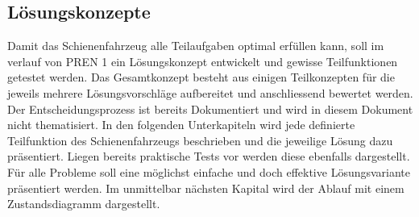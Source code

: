 \documentclass[../../main.tex]{subfiles}
\begin{document}
\subsection{Lösungskonzepte}
Damit das Schienenfahrzeug alle Teilaufgaben optimal erfüllen kann, soll im verlauf von PREN 1 ein Lösungskonzept entwickelt und gewisse Teilfunktionen getestet werden. Das Gesamtkonzept besteht aus einigen Teilkonzepten für die jeweils mehrere Lösungsvorschläge aufbereitet und anschliessend bewertet werden. Der Entscheidungsprozess ist bereits Dokumentiert und wird in diesem Dokument nicht thematisiert. In den folgenden Unterkapiteln wird jede definierte Teilfunktion des Schienenfahrzeugs beschrieben und die jeweilige Lösung dazu präsentiert. Liegen bereits praktische Tests vor werden diese ebenfalls dargestellt. Für alle Probleme soll eine möglichst einfache und doch effektive Lösungsvariante präsentiert werden.
Im unmittelbar nächsten Kapital wird der Ablauf mit einem Zustandsdiagramm dargestellt.
\end{document}
